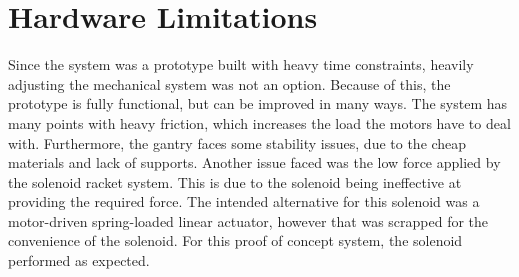 \section{Hardware Limitations}
Since the system was a prototype built with heavy time constraints, heavily adjusting the mechanical system was not an option. Because of this, the prototype is fully functional, but can be improved in many ways. The system has many points with heavy friction, which increases the load the motors have to deal with. Furthermore, the gantry faces some stability issues, due to the cheap materials and lack of supports.
Another issue faced was the low force applied by the solenoid racket system. This is due to the solenoid being ineffective at providing the required force. The intended alternative for this solenoid was a motor-driven spring-loaded linear actuator, however that was scrapped for the convenience of the solenoid. For this proof of concept system, the solenoid performed as expected.